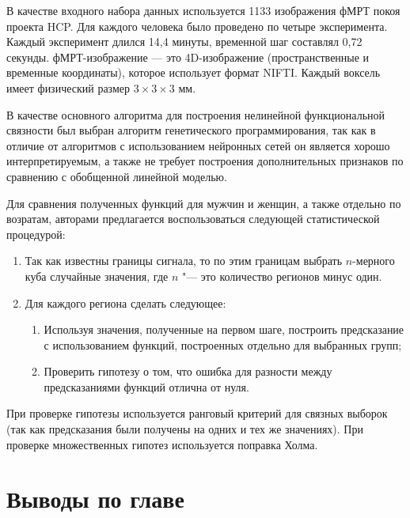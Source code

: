 В качестве входного набора данных используется 1133 изображения фМРТ покоя проекта HCP. Для каждого человека было проведено по четыре эксперимента. Каждый эксперимент длился 14,4 минуты, временной шаг составлял 0,72 секунды. фМРТ-изображение — это 4D-изображение (пространственные и временные координаты), которое использует формат NIFTI. Каждый воксель имеет физический размер $3\times 3 \times 3$ мм.

В качестве основного алгоритма для построения нелинейной функциональной связности был выбран алгоритм генетического программирования, так как в отличие от алгоритмов с использованием нейронных сетей он является хорошо интерпретируемым, а также не требует построения дополнительных признаков по сравнению с обобщенной линейной моделью.


Для сравнения полученных функций для мужчин и женщин, а также отдельно по возратам, авторами предлагается воспользоваться следующей статистической процедурой:

\begin{enumerate}
    \item Так как известны границы сигнала, то по этим границам выбрать $n$-мерного куба случайные значения, где $n$ "--- это количество регионов минус один.
    \item Для каждого региона сделать следующее:
    \begin{enumerate}
        \item Используя значения, полученные на первом шаге, построить предсказание с использованием функций, построенных отдельно для выбранных групп;
        \item Проверить гипотезу о том, что ошибка для разности между предсказаниями функций отлична от нуля.
    \end{enumerate}
\end{enumerate}

При проверке гипотезы используется ранговый критерий для связных выборок (так как предсказания были получены на одних и тех же значениях). При проверке множественных гипотез используется поправка Холма.


\section{Выводы по главе}\label{sect4_3}

\clearpage